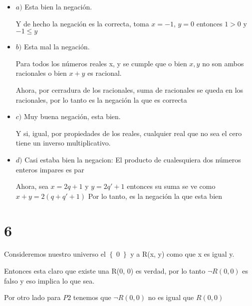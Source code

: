 \documentclass[12pt, fleqn]{article}                            %
\theoremstyle{break}                                            %
\newcommand{\Set}[1]            {\left\{ \; #1 \; \right\}}     %
\begin{document}
    \begin{itemize}
        
        \item $a)$
            Esta bien la negación.

            Y de hecho la negación es la correcta, toma $x = -1$, $y = 0$
            entonces $1 > 0$ y $-1 \leq y$

        \item $b)$
            Esta mal la negación.

            Para todos los números reales x, y se cumple que o bien
            $x, y$ no son ambos racionales o bien $x+y$ es racional.

            Ahora, por cerradura de los racionales, suma de racionales se queda
            en los racionales, por lo tanto es la negación la que es correcta

        \item $c)$
            Muy buena negación, esta bien.

            Y si, igual, por propiedades de los reales, cualquier real
            que no sea el cero tiene un inverso multiplicativo.

        \item $d)$
            Casi estaba bien la negacion: 
            El producto de cualesquiera dos números enteros
            impares es par

            Ahora, sea $x = 2q + 1$ y $y = 2q' + 1$
            entonces su suma se ve como $x+y=2(q + q' + 1)$
            Por lo tanto, es la negación la que esta bien


    \end{itemize}



\vspace{1em}
\section{6}

    Consideremos nuestro universo el $\Set{ 0}$
    y a R(x, y) como que x es igual y.

    Entonces esta claro que existe una R(0, 0) es verdad, por lo tanto
    $\neg R(0, 0)$ es falso y eso implica lo que sea.

    Por otro lado para $P2$ tenemos que $\neg R(0, 0)$ no es igual que $R(0, 0)$
 
\end{document}
